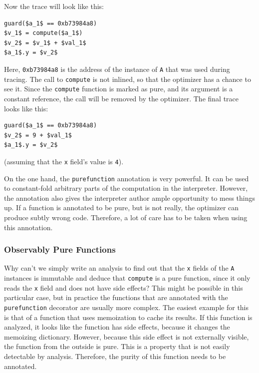 \documentclass{sigplanconf}
\begin{document}
Now the trace will look like this:
%
\begin{lstlisting}[mathescape,basicstyle=\ttfamily]
guard($a_1$ == 0xb73984a8)
$v_1$ = compute($a_1$)
$v_2$ = $v_1$ + $val_1$
$a_1$.y = $v_2$
\end{lstlisting}

Here, \texttt{0xb73984a8} is the address of the instance of \texttt{A} that was used
during tracing. The call to \texttt{compute} is not inlined, so that the optimizer
has a chance to see it. Since the \texttt{compute} function is marked as pure, and its
argument
is a constant reference, the call will be removed by the optimizer. The final
trace looks like this:
%
\begin{lstlisting}[mathescape,basicstyle=\ttfamily]
guard($a_1$ == 0xb73984a8)
$v_2$ = 9 + $val_1$
$a_1$.y = $v_2$
\end{lstlisting}

(assuming that the \texttt{x} field's value is \texttt{4}).

On the one hand, the \texttt{purefunction} annotation is very powerful. It can be
used to constant-fold arbitrary parts of the computation in the interpreter.
However, the annotation also gives the interpreter author ample opportunity to mess things up. If a
function is annotated to be pure, but is not really, the optimizer can produce
subtly wrong code. Therefore, a lot of care has to be taken when using this
annotation.


\subsubsection{Observably Pure Functions}

Why can't we simply write an analysis to find out that the \texttt{x} fields of the
\texttt{A} instances is immutable and deduce that \texttt{compute} is a pure function,
since it only reads the \texttt{x} field and does not have side effects? This might
be possible in this particular case, but in practice the functions that are
annotated with the \texttt{purefunction} decorator are usually more complex.
The easiest example for this is that of a function that uses memoization to
cache its results. If this function is analyzed, it looks like the function has
side effects, because it changes the memoizing dictionary. However, because this side
effect is not externally visible, the function from the outside is pure. This is
a property that is not easily detectable by analysis. Therefore, the purity
of this function needs to be annotated.
\end{document}
